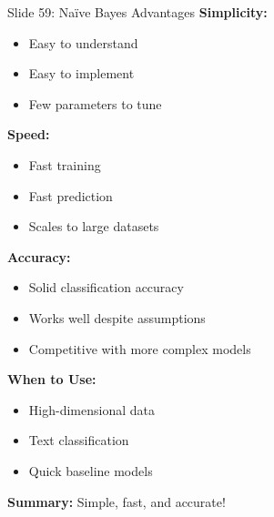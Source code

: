 \documentclass[8pt]{beamer}
\begin{document}
	\begin{frame}{Slide 59: Naïve Bayes Advantages}
		\fontsize{6.5}{7.5}\selectfont
		\textbf{Simplicity:}
		\begin{itemize}
			\item Easy to understand
			\item Easy to implement
			\item Few parameters to tune
		\end{itemize}
		
		\vspace{0.1cm}
		\textbf{Speed:}
		\begin{itemize}
			\item Fast training
			\item Fast prediction
			\item Scales to large datasets
		\end{itemize}
		
		\vspace{0.1cm}
		\textbf{Accuracy:}
		\begin{itemize}
			\item Solid classification accuracy
			\item Works well despite assumptions
			\item Competitive with more complex models
		\end{itemize}
		
		\vspace{0.1cm}
		\textbf{When to Use:}
		\begin{itemize}
			\item High-dimensional data
			\item Text classification
			\item Quick baseline models
		\end{itemize}
		
		\textcolor{myblue}{\textbf{Summary:}} Simple, fast, and accurate!
	\end{frame}
	
\end{document}
